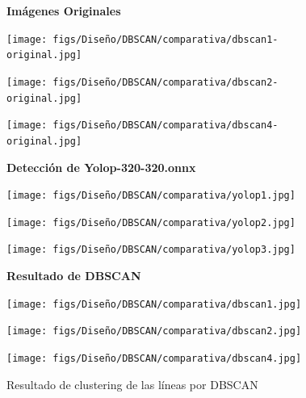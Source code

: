 \begin{figure}[H]
  \centering

  \textbf{Imágenes Originales}
  \vspace{0.5cm}

  \begin{minipage}[t]{0.3\textwidth}
      \centering
      \texttt{[image: figs/Diseño/DBSCAN/comparativa/dbscan1-original.jpg]}
      \caption*{}
  \end{minipage}
  \hfill
  \begin{minipage}[t]{0.3\textwidth}
      \centering
      \texttt{[image: figs/Diseño/DBSCAN/comparativa/dbscan2-original.jpg]}
      \caption*{}
  \end{minipage}
  \hfill
  \begin{minipage}[t]{0.3\textwidth}
      \centering
      \texttt{[image: figs/Diseño/DBSCAN/comparativa/dbscan4-original.jpg]}
      \caption*{}
  \end{minipage}

  \vspace{0.5cm}

  \textbf{Detección de Yolop-320-320.onnx}
  \vspace{0.5cm}

  \begin{minipage}[t]{0.3\textwidth}
      \centering
      \texttt{[image: figs/Diseño/DBSCAN/comparativa/yolop1.jpg]}
      \caption*{}
  \end{minipage}
  \hfill
  \begin{minipage}[t]{0.3\textwidth}
      \centering
      \texttt{[image: figs/Diseño/DBSCAN/comparativa/yolop2.jpg]}
      \caption*{}
  \end{minipage}
  \hfill
  \begin{minipage}[t]{0.3\textwidth}
      \centering
      \texttt{[image: figs/Diseño/DBSCAN/comparativa/yolop3.jpg]}
      \caption*{}
  \end{minipage}

  \vspace{0.5cm}

  \textbf{Resultado de DBSCAN}
  \vspace{0.5cm}

  \begin{minipage}[t]{0.3\textwidth}
      \centering
      \texttt{[image: figs/Diseño/DBSCAN/comparativa/dbscan1.jpg]}
      \caption*{}
  \end{minipage}
  \hfill
  \begin{minipage}[t]{0.3\textwidth}
      \centering
      \texttt{[image: figs/Diseño/DBSCAN/comparativa/dbscan2.jpg]}
      \caption*{}
  \end{minipage}
  \hfill
  \begin{minipage}[t]{0.3\textwidth}
      \centering
      \texttt{[image: figs/Diseño/DBSCAN/comparativa/dbscan4.jpg]}
      \caption*{}
  \end{minipage}

  \caption{Resultado de clustering de las líneas por DBSCAN}
  \label{clasificación}
\end{figure}

